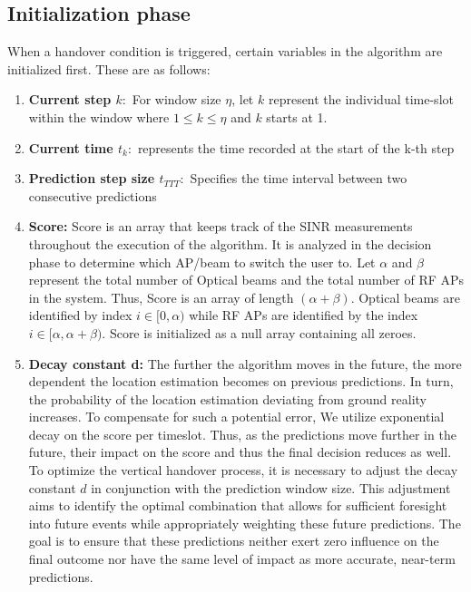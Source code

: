 \subsection{Initialization phase}
When a handover condition is triggered, certain variables in the algorithm are initialized first. These are as follows:
\begin{enumerate}
    \item \textbf{Current step $k:$} For window size $\eta$, let $k$ represent the individual time-slot within the window where $1 \leq k \leq \eta$ and $k$ starts at 1. 
    \item \textbf{Current time $t_k:$} represents the time recorded at the start of the k-th step 
    \item \textbf{Prediction step size $t_{TTT}:$} Specifies the time interval between two consecutive predictions
    \item \textbf{Score:} Score is an array that keeps track of the SINR measurements throughout the execution of the algorithm. It is analyzed in the decision phase to determine which AP/beam to switch the user to. Let $\alpha$ and $\beta$ represent the total number of Optical beams and the total number of RF APs in the system. Thus, Score is an array of length $(\alpha + \beta)$. Optical beams are identified by index $i \in [0, \alpha)$ while RF APs are identified by the index $i \in [\alpha, \alpha + \beta)$. Score is initialized as a null array containing all zeroes.
    \item \textbf{Decay constant d:} The further the algorithm moves in the future, the more dependent the location estimation becomes on previous predictions. In turn, the probability of the location estimation deviating from ground reality increases. To compensate for such a potential error, We utilize exponential decay on the score per timeslot. Thus, as the predictions move further in the future, their impact on the score and thus the final decision reduces as well. To optimize the vertical handover process, it is necessary to adjust the decay constant $d$ in conjunction with the prediction window size. This adjustment aims to identify the optimal combination that allows for sufficient foresight into future events while appropriately weighting these future predictions. The goal is to ensure that these predictions neither exert zero influence on the final outcome nor have the same level of impact as more accurate, near-term predictions.
\end{enumerate}

